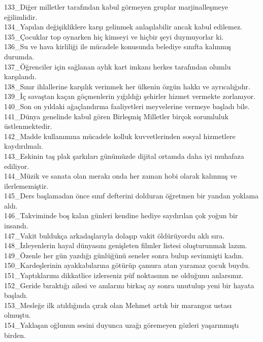 133\_Diğer milletler tarafından kabul görmeyen gruplar marjinalleşmeye eğilimlidir.\\
134\_Yapılan değişikliklere karşı gelinmek anlaşılabilir ancak kabul edilemez.\\
135\_Çocuklar top oynarken hiç kimseyi ve hiçbir şeyi duymuyorlar ki.\\
136\_Su ve hava kirliliği ile mücadele konusunda belediye sınıfta kalınmış durumda.\\
137\_Öğrenciler için sağlanan aylık kart imkanı herkes tarafından olumlu karşılandı.\\
138\_Sınır ihlallerine karşılık verinmek her ülkenin özgün hakkı ve ayrıcalığıdır.\\
139\_İç savaştan kaçan göçmenlerin yığıldığı şehirler hizmet vermekte zorlanıyor.\\
140\_Son on yıldaki ağaçlandırma faaliyetleri meyvelerine vermeye başladı bile.\\
141\_Dünya genelinde kabul gören Birleşmiş Milletler birçok sorumluluk üstlenmektedir.\\
142\_Madde kullanımına mücadele kolluk kuvvetlerinden sosyal hizmetlere kaydırılmalı.\\
143\_Eskinin taş plak şarkıları günümüzde dijital ortamda daha iyi muhafaza ediliyor.\\
144\_Müzik ve sanata olan merakı onda her zaman hobi olarak kalınmış ve ilerlememiştir.\\
145\_Ders başlamadan önce sınıf defterini dolduran öğretmen bir yandan yoklama aldı.\\
146\_Takviminde boş kalan günleri kendine hediye saydırılan çok yoğun bir insandı.\\
147\_Vakit buldukça arkadaşlarıyla dolaşıp vakit öldürüyordu aklı sıra.\\
148\_İzleyenlerin hayal dünyasını genişleten filmler listesi oluşturunmak lazım.\\
149\_Özenle her gün yazdığı günlüğünü seneler sonra bulup sevinmişti kadın.\\
150\_Kardeşlerinin ayakkabılarına götürüp çamura atan yaramaz çocuk buydu.\\
151\_Yaptıklarımı dikkatlice izlerseniz püf noktasının ne olduğunu anlarsınız.\\
152\_Geride bıraktığı ailesi ve anılarını birkaç ay sonra unutulup yeni bir hayata başladı.\\
153\_Mesleğe ilk atıldığında çırak olan Mehmet artık bir marangoz ustası olmuştu.\\
154\_Yaklaşan oğlunun sesini duyunca uzağı göremeyen gözleri yaşarınmıştı birden.\\